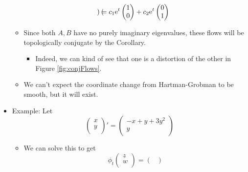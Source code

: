 \documentclass[../notes.tex]{subfiles}
\begin{document}
\begin{itemize}
\begin{itemize}
\begin{align*}
\begin{pmatrix}
            \end{pmatrix}
                = c_1\e[t]
                \begin{pmatrix}
                    1\\
                    0\\
                \end{pmatrix}
                +c_2\e[t]
                \begin{pmatrix}
                    0\\
                    1\\
                \end{pmatrix}
        \end{align*}
        \item Since both $A,B$ have no purely imaginary eigenvalues, these flows will be topologically conjugate by the Corollary.
        \begin{itemize}
            \item Indeed, we can kind of see that one is a distortion of the other in Figure \ref{fig:conjFlows}.
        \end{itemize}
        \item We can't expect the coordinate change from Hartman-Grobman to be smooth, but it will exist.
    \end{itemize}
    \item Example: Let
    \begin{equation*}
        \begin{pmatrix}
            x\\
            y\\
        \end{pmatrix}'
        =
        \begin{pmatrix}
            -x+y+3y^2\\
            y\\
        \end{pmatrix}
    \end{equation*}
    \begin{itemize}
        \item We can solve this to get
        \begin{equation*}
            \phi_t
            \begin{pmatrix}
                z\\
                w\\
            \end{pmatrix}
            =
            \begin{pmatrix}

\end{pmatrix}
\end{equation*}
\end{itemize}
\end{itemize}
\end{document}
